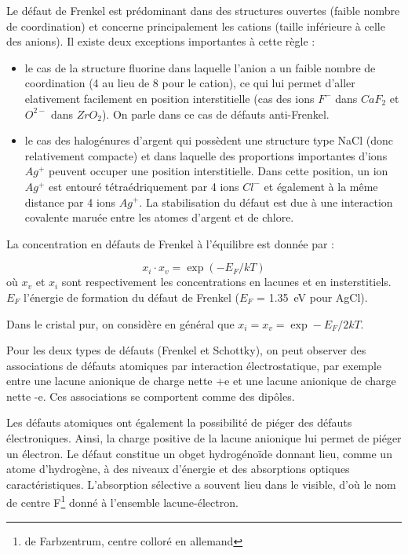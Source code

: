 Le défaut de Frenkel est prédominant dans des structures ouvertes (faible nombre
de coordination) et concerne principalement les cations (taille inférieure à
celle des anions). Il existe deux exceptions importantes à cette règle :

\begin{itemize}
    \item le cas de la structure fluorine dans laquelle l'anion a un faible
        nombre de coordination (4 au lieu de 8 pour le cation), ce qui lui permet
        d'aller elativement facilement en position interstitielle (cas des ions
        $F^-$ dans $CaF_2$ et $O^{2-}$ dans $ZrO_2$). On parle dans ce cas de
        défauts anti-Frenkel.
    \item le cas des halogénures d'argent qui possèdent une structure type NaCl
        (donc relativement compacte) et dans laquelle des proportions importantes
        d'ions $Ag^+$ peuvent occuper une position interstitielle. Dans cette
        position, un ion $Ag^+$ est entouré tétraédriquement par 4 ions $Cl^-$ et
        également à la même distance par 4 ions $Ag^+$. La stabilisation du
        défaut est due à une interaction covalente maruée entre les atomes
        d'argent et de chlore.
\end{itemize}

La concentration en défauts de Frenkel à l'équilibre est donnée par :

\begin{equation}
    x_i \cdot x_v = \exp (-E_F / kT)
\end{equation}
où $x_v$ et $x_i$ sont respectivement les concentrations en lacunes et en
insterstitiels. $E_F$ l'énergie de formation du défaut de Frenkel ($E_F$ =
\SI{1.35}{\electronvolt} pour AgCl).
 
Dans le cristal pur, on considère en général que $x_i = x_v = \exp -E_F/2kT$.
 
Pour les deux types de défauts (Frenkel et Schottky), on peut observer des
associations de défauts atomiques par interaction électrostatique, par exemple
entre une lacune anionique de charge nette +e et une lacune anionique de charge
nette -e. Ces associations se comportent comme des dipôles.
 
Les défauts atomiques ont également la possibilité de piéger des défauts
électroniques. Ainsi, la charge positive de la lacune anionique lui permet de
piéger un électron. Le défaut constitue un obget hydrogénoïde donnant lieu,
comme un atome d'hydrogène, à des niveaux d'énergie et des absorptions optiques
caractéristiques. L'absorption sélective a souvent lieu dans le visible, d'où le
nom de centre F\footnote{de Farbzentrum, centre colloré en allemand} donné à
l'ensemble lacune-électron.
 
